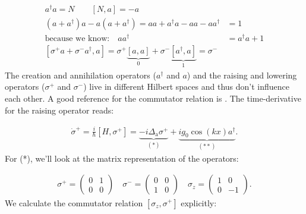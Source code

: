 \begin{align}
a^\dagger a = N \qquad [N, a] = -a \\
(a + a^\dagger) a - a (a + a^\dagger) = aa + a^\dagger a - aa - aa^\dagger & = 1 \\
\text{because we know:} \quad aa^\dagger & = a^\dagger a + 1 \nonumber \\
[\sigma^+ a + \sigma^- a^\dagger, a] = \sigma^+ \underbrace{[a, a]}_{0} + \sigma^- \underbrace{[a^\dagger, a]}_{1} = \sigma^-
\end{align}The creation and annihilation operators ($a^\dagger$ and $a$) and the raising and lowering operators ($\sigma^+$ and $\sigma^-$) live in different Hilbert spaces and thus don't influence each other. A good reference for the commutator relation is \cite{bertlmann}. The time-derivative for the raising operator reads:

\begin{align}
\dot{\sigma}^+ = \frac{i}{\hbar} [H, \sigma^+] = \underbrace{-i \Delta_\text{a} \sigma^+}_{(*)} + \underbrace{i g_0 \cos(kx) a^\dagger}_{(**)}.
\end{align}For (*), we'll look at the matrix representation of the operators:

\begin{align}
\sigma^+ = \begin{pmatrix}0 & 1 \\ 0 & 0\end{pmatrix} \quad \sigma^- = \begin{pmatrix}0 & 0 \\ 1 & 0\end{pmatrix} \quad \sigma_z = \begin{pmatrix}1 & 0 \\ 0 & -1\end{pmatrix}.
\end{align}We calculate the commutator relation $[\sigma_z, \sigma^+]$ explicitly:

